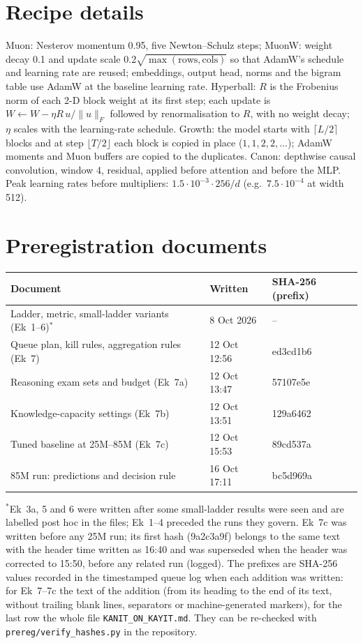 \documentclass[11pt]{article}
\begin{document}



\appendix
\section{Recipe details}\label{app:recipe}
Muon: Nesterov momentum 0.95, five Newton--Schulz steps; MuonW: weight decay 0.1 and update scale $0.2\sqrt{\max(\text{rows},\text{cols})}$ so that AdamW's schedule and learning rate are reused; embeddings, output head, norms and the bigram table use AdamW at the baseline learning rate.
Hyperball: $R$ is the Frobenius norm of each 2-D block weight at its first step; each update is $W\leftarrow W-\eta R\,u/\|u\|_F$ followed by renormalisation to $R$, with no weight decay; $\eta$ scales with the learning-rate schedule.
Growth: the model starts with $\lceil L/2\rceil$ blocks and at step $\lfloor T/2\rfloor$ each block is copied in place ($1,1,2,2,\dots$); AdamW moments and Muon buffers are copied to the duplicates.
Canon: depthwise causal convolution, window 4, residual, applied before attention and before the MLP.
Peak learning rates before multipliers: $1.5\cdot10^{-3}\cdot256/d$ (e.g.\ $7.5\cdot10^{-4}$ at width 512).

\section{Preregistration documents}\label{app:prereg}
\begin{center}\small
\begin{tabular}{lll}\toprule
Document & Written & SHA-256 (prefix) \\ \midrule
Ladder, metric, small-ladder variants (Ek~1--6)$^\ast$ & 8 Oct 2026 & -- \\
Queue plan, kill rules, aggregation rules (Ek~7) & 12 Oct 12:56 & ed3cd1b6 \\
Reasoning exam sets and budget (Ek~7a) & 12 Oct 13:47 & 57107e5e \\
Knowledge-capacity settings (Ek~7b) & 12 Oct 13:51 & 129a6462 \\
Tuned baseline at 25M--85M (Ek~7c) & 12 Oct 15:53 & 89cd537a \\
85M run: predictions and decision rule & 16 Oct 17:11 & bc5d969a \\ \bottomrule
\end{tabular}\end{center}
$^\ast$Ek~3a, 5 and 6 were written after some small-ladder results were seen and are labelled post hoc in the files; Ek~1--4 preceded the runs they govern.
Ek~7c was written before any 25M run; its first hash (9a2c3a9f) belongs to the same text with the header time written as 16:40 and was superseded when the header was corrected to 15:50, before any related run (logged). The prefixes are SHA-256 values recorded in the timestamped queue log when each addition was written: for Ek~7--7c the text of the addition (from its heading to the end of its text, without trailing blank lines, separators or machine-generated markers), for the last row the whole file \texttt{KANIT\_ON\_KAYIT.md}. They can be re-checked with \texttt{prereg/verify\_hashes.py} in the repository.
\end{document}

